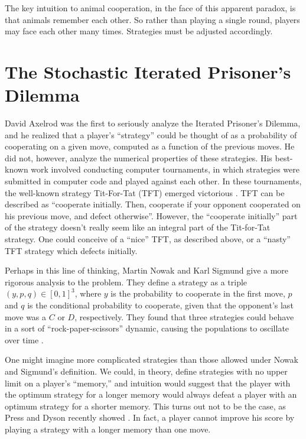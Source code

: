 \documentclass{article}
\begin{document}
The key intuition to animal cooperation, in the face of this apparent paradox, is that animals remember each other. So rather than playing a single round, players may face each other many times. Strategies must be adjusted accordingly.

\section{The Stochastic Iterated Prisoner's Dilemma}
David Axelrod was the first to seriously analyze the Iterated Prisoner's Dilemma, and he realized that a player's ``strategy'' could be thought of as a probability of cooperating on a given move, computed as a function of the previous moves. He did not, however, analyze the numerical properties of these strategies. His best-known work involved conducting computer tournaments, in which strategies were submitted in computer code and played against each other. In these tournaments, the well-known strategy Tit-For-Tat (TFT) emerged victorious \cite{axelrod_evolution_1981}. TFT can be described as ``cooperate initially. Then, cooperate if your opponent cooperated on his previous move, and defect otherwise''. However, the ``cooperate initially'' part of the strategy doesn't really seem like an integral part of the Tit-for-Tat strategy. One could conceive of a ``nice'' TFT, as described above, or a ``nasty'' TFT strategy which defects initially.

Perhaps in this line of thinking, Martin Nowak and Karl Sigmund give a more rigorous analysis to the problem. They define a strategy as a triple \((y, p, q) \in [0, 1]^3\), where \(y\) is the probability to cooperate in the first move, \(p\) and \(q\) is the conditional probability to cooperate, given that the opponent's last move was a \(C\) or \(D\), respectively. They found that three strategies could behave in a sort of ``rock-paper-scissors'' dynamic, causing the populations to oscillate over time \cite{nowak_game-dynamical_1989}.

One might imagine more complicated strategies than those allowed under Nowak and Sigmund's definition. We could, in theory, define strategies with no upper limit on a player's ``memory,'' and intuition would suggest that the player with the optimum strategy for a longer memory would always defeat a player with an optimum strategy for a shorter memory. This turns out not to be the case, as Press and Dyson recently showed \cite{press_iterated_2012}. In fact, a player cannot improve his score by playing a strategy with a longer memory than one move. 
\end{document}
